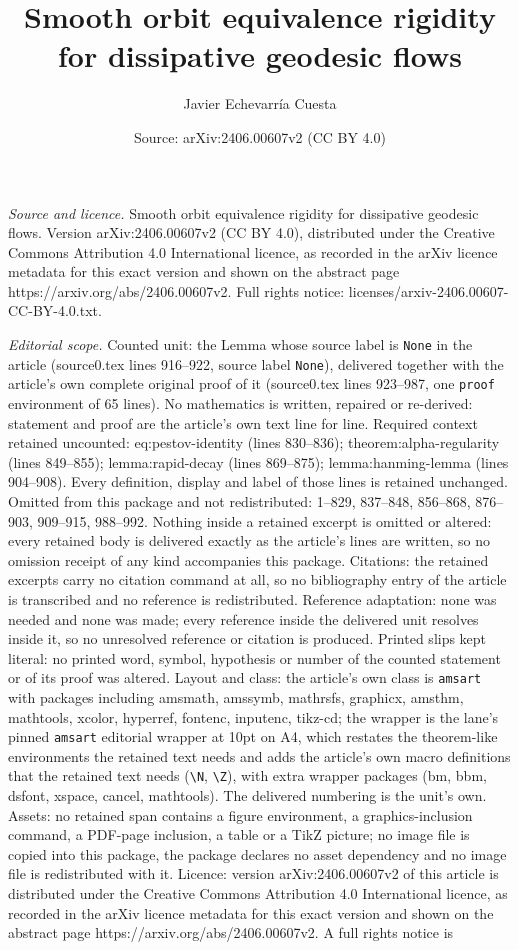 \documentclass[10pt,a4paper]{amsart}
\title[Smooth orbit equivalence rigidity for dissipative geodesic f]{Smooth orbit equivalence rigidity for dissipative geodesic flows}
\author{Javier Echevarr\'ia Cuesta}
\date{Source: arXiv:2406.00607v2 (CC BY 4.0)}
\begin{document}
\maketitle

\noindent\emph{Source and licence.} Smooth orbit equivalence rigidity for dissipative geodesic flows. Version arXiv:2406.00607v2 (CC BY 4.0), distributed under the Creative Commons Attribution 4.0 International licence, as recorded in the arXiv licence metadata for this exact version and shown on the abstract page https://arxiv.org/abs/2406.00607v2. Full rights notice: licenses/arxiv-2406.00607-CC-BY-4.0.txt.\par\smallskip

\noindent\textit{Editorial scope.} Counted unit: the Lemma whose source label is \texttt{None} in the article (source0.tex lines 916--922, source label \texttt{None}), delivered together with the article's own complete original proof of it (source0.tex lines 923--987, one \texttt{proof} environment of 65 lines). No mathematics is written, repaired or re-derived: statement and proof are the article's own text line for line. Required context retained uncounted: eq:pestov-identity (lines 830--836); theorem:alpha-regularity (lines 849--855); lemma:rapid-decay (lines 869--875); lemma:hanming-lemma (lines 904--908). Every definition, display and label of those lines is retained unchanged. Omitted from this package and not redistributed: 1--829, 837--848, 856--868, 876--903, 909--915, 988--992. Nothing inside a retained excerpt is omitted or altered: every retained body is delivered exactly as the article's lines are written, so no omission receipt of any kind accompanies this package. Citations: the retained excerpts carry no citation command at all, so no bibliography entry of the article is transcribed and no reference is redistributed. Reference adaptation: none was needed and none was made; every reference inside the delivered unit resolves inside it, so no unresolved reference or citation is produced. Printed slips kept literal: no printed word, symbol, hypothesis or number of the counted statement or of its proof was altered. Layout and class: the article's own class is \texttt{amsart} with packages including amsmath, amssymb, mathrsfs, graphicx, amsthm, mathtools, xcolor, hyperref, fontenc, inputenc, tikz-cd; the wrapper is the lane's pinned \texttt{amsart} editorial wrapper at 10pt on A4, which restates the theorem-like environments the retained text needs and adds the article's own macro definitions that the retained text needs (\texttt{\textbackslash N}, \texttt{\textbackslash Z}), with extra wrapper packages (bm, bbm, dsfont, xspace, cancel, mathtools). The delivered numbering is the unit's own. Assets: no retained span contains a figure environment, a graphics-inclusion command, a PDF-page inclusion, a table or a TikZ picture; no image file is copied into this package, the package declares no asset dependency and no image file is redistributed with it. Licence: version arXiv:2406.00607v2 of this article is distributed under the Creative Commons Attribution 4.0 International licence, as recorded in the arXiv licence metadata for this exact version and shown on the abstract page https://arxiv.org/abs/2406.00607v2. A full rights notice is 
\end{document}
